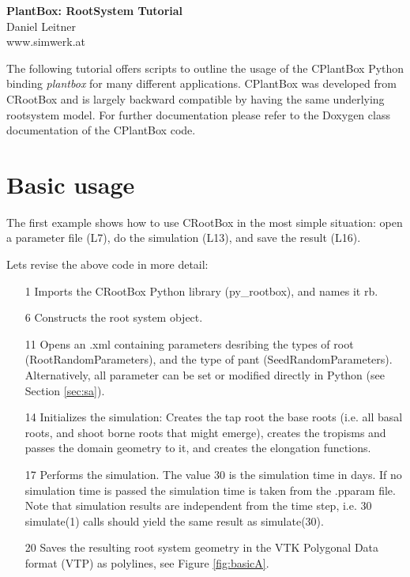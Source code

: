 \documentclass[a4paper]{article}
\begin{document}
\begin{center}
\vspace{0.5 cm}
\huge{\textbf{PlantBox: RootSystem Tutorial}} \\
\vspace{0.5 cm}
\normalsize
Daniel Leitner \\
www.simwerk.at 
\end{center}

\vspace{0.5 cm}

\noindent 
The following tutorial offers scripts to outline the usage of the CPlantBox Python binding \emph{plantbox} for many different applications. CPlantBox was developed from CRootBox and is largely backward compatible by having the same underlying rootsystem model. For further documentation please refer to the Doxygen class documentation of the CPlantBox code.


\vspace{0.5 cm}

\tableofcontents

\newpage



\section{Basic usage}
 
The first example shows how to use CRootBox in the most simple situation: open a parameter file (L7), do the simulation (L13), and save the result (L16). 


\noindent 
Lets revise the above code in more detail: 
\begin{itemize}
 \item[1] Imports the CRootBox Python library (py\_rootbox), and names it rb.
 \item[6] Constructs the root system object.
 \item[11] Opens an .xml containing parameters desribing the types of root (RootRandomParameters), and the type of pant (SeedRandomParameters). Alternatively, all parameter can be set or modified directly in Python (see Section \ref{sec:sa}).
 \item[14] Initializes the simulation: Creates the tap root the base roots (i.e. all basal roots, and shoot borne roots that might emerge), creates the tropisms and passes the domain geometry to it, and creates the elongation functions. 
 \item[17] Performs the simulation. The value 30 is the simulation time in days. If no simulation time is passed the simulation time is taken from the .pparam file. Note that simulation results are independent from the time step, 
 i.e. 30 simulate(1) calls should yield the same result as simulate(30). 
 \item[20] Saves the resulting root system geometry in the VTK Polygonal Data format (VTP) as polylines, see Figure \ref{fig:basicA}. 
\end{itemize}
\end{document}
